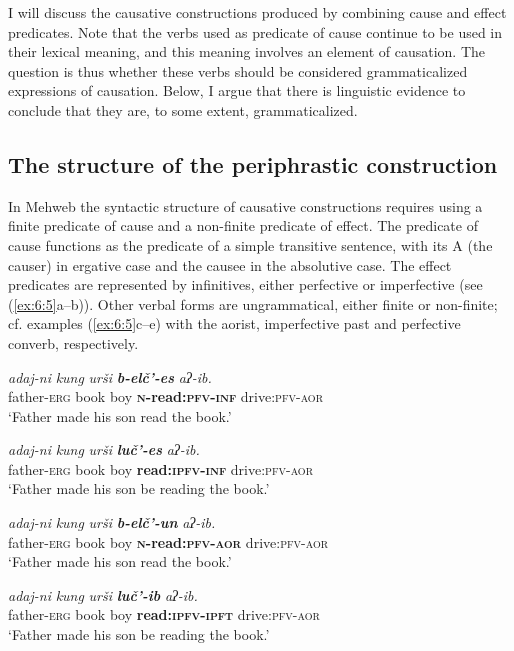 ﻿\documentclass[output=paper]{langsci/langscibook}
\begin{document}
I will discuss the causative constructions produced by combining cause
and effect predicates. Note that the verbs used as predicate of cause
continue to be used in their lexical meaning, and this meaning involves
an element of causation. The question is thus whether these verbs should
be considered grammaticalized expressions of causation. Below, I argue
that there is linguistic evidence to conclude that they are, to some
extent, grammaticalized.

\subsection{The structure of the periphrastic construction}

In Mehweb the syntactic structure of causative constructions requires
using a finite predicate of cause and a non-finite predicate of effect.
The predicate of cause functions as the predicate of a simple
transitive sentence, with its A (the causer) in ergative case and the
causee in the absolutive case. The effect predicates are represented by
infinitives, either perfective or imperfective (see (\ref{ex:6:5}a–b)). Other
verbal forms are ungrammatical, either finite or non-finite; cf.
examples (\ref{ex:6:5}c–e) with the aorist, imperfective past and perfective
converb, respectively.

\ea \label{ex:6:5} %
\ea %
\gll \emph{adaj-ni} \emph{kung} \emph{urši} \emph{\textbf{b-elč'-es}} \emph{aʔ-ib.} \\
father-\textsc{erg} book boy \textbf{\textsc{n}-read:\textsc{pfv}-\textsc{inf}} drive:\textsc{pfv}-\textsc{aor}\\
\glt `Father made his son read the book.'

\ex %
\gll \emph{adaj-ni} \emph{kung} \emph{urši} \emph{\textbf{luč'-es}} \emph{aʔ-ib.} \\
father-\textsc{erg} book boy \textbf{read:\textsc{ipfv}-\textsc{inf}} drive:\textsc{pfv}-\textsc{aor}\\
\glt `Father made his son be reading the book.'

\ex %
\gll *\emph{adaj-ni} \emph{kung} \emph{urši} \emph{\textbf{b-elč'-un}} \emph{aʔ-ib.} \\
father-\textsc{erg} book boy \textbf{\textsc{n}-read:\textsc{pfv}-\textsc{aor}} drive:\textsc{pfv}-\textsc{aor}\\
\glt
`Father made his son read the book.'

\ex %
\gll *\emph{adaj-ni} \emph{kung} \emph{urši} \emph{\textbf{luč'-ib}} \emph{aʔ-ib.} \\
father-\textsc{erg} book boy \textbf{read:\textsc{ipfv}-\textsc{ipft}} drive:\textsc{pfv}-\textsc{aor}\\
\glt `Father made his son be reading the book.'
\end{document}
